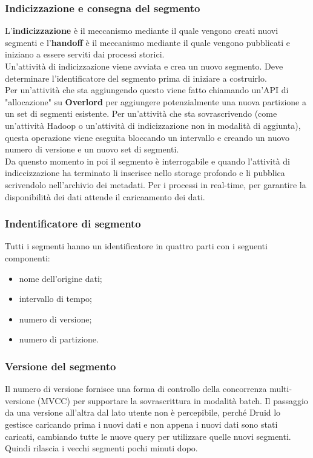 \documentclass{article}
\begin{document}
\subsubsection{Indicizzazione e consegna del segmento}
L'\textbf{indicizzazione} è il meccanismo mediante il quale vengono creati nuovi segmenti e l'\textbf{handoff} è il meccanismo mediante il quale vengono pubblicati e iniziano a essere serviti dai processi storici. \\
Un'attività di indicizzazione viene avviata e crea un nuovo segmento. Deve determinare l'identificatore del segmento prima di iniziare a costruirlo.\\ Per un'attività che sta aggiungendo questo viene fatto chiamando un'API di "allocazione" su \textbf{Overlord} per aggiungere potenzialmente una nuova partizione a un set di segmenti esistente.  Per un'attività che sta sovrascrivendo (come un'attività Hadoop o un'attività di indicizzazione non in modalità di aggiunta), questa operazione viene eseguita bloccando un intervallo e creando un nuovo numero di versione e un nuovo set di segmenti.\\
Da quensto momento in poi il segmento è interrogabile e quando l'attività di indiccizzazione ha terminato li inserisce nello storage profondo e li pubblica scrivendolo nell'archivio dei metadati. Per i processi in real-time, per garantire la disponibilità dei dati attende il caricaamento dei dati.
\subsubsection{Indentificatore di segmento}
Tutti i segmenti hanno un identificatore in quattro parti con i seguenti componenti:
\begin{itemize}
    \item nome dell'origine dati;
    \item intervallo di tempo;
    \item numero di versione;
    \item numero di partizione.
\end{itemize}
\subsubsection{Versione del segmento}
Il numero di versione fornisce una forma di controllo della concorrenza multi-versione (MVCC) per supportare la sovrascrittura in modalità batch. Il passaggio da una versione all'altra dal lato utente non è percepibile,  perché Druid lo gestisce caricando prima i nuovi dati e non appena i nuovi dati sono stati caricati, cambiando tutte le nuove query per utilizzare quelle nuovi segmenti. Quindi rilascia i vecchi segmenti pochi minuti dopo. 
\end{document}
